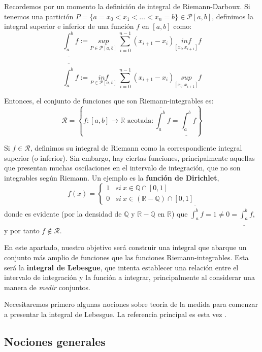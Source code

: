 Recordemos por un momento la definición de integral de Riemann-Darboux. Si tenemos una partición $P = \{ a = x_0 < x_1 < \dots < x_n = b\} \in \mathcal P [a,b]$, definimos la integral superior e inferior de una función $f$ en $[a,b]$ como: $$\underline{\int_a^b} f := \underset{P \in \mathcal P [a,b]}{sup} \ \sum_{i=0}^{n-1} (x_{i+1} - x_i) \underset{[x_i, x_{i+1}]}{inf} f$$

$$\overline {\int_a^b} f := \underset{P \in \mathcal P [a,b]}{inf} \ \sum_{i=0}^{n-1} (x_{i+1} - x_i) \underset{[x_i, x_{i+1}]}{sup} f$$

Entonces, el conjunto de funciones que son Riemann-integrables es: $$\mathcal R = \left\{ f:[a,b] \to \mathbb{R} \text{ acotada} : \overline {\int_a^b} f = \underline {\int_a^b} f\right\}$$

Si $f \in \mathcal R$, definimos su integral de Riemann como la correspondiente integral superior (o inferior). Sin embargo, hay ciertas funciones, principalmente aquellas que presentan muchas oscilaciones en el intervalo de integración, que no son integrables según Riemann. Un ejemplo es la \textbf{función de Dirichlet}, $$f(x) = \begin{cases} 1 & si \ x \in \mathbb Q \cap [0,1]\\ 0 & si \ x \in (\mathbb{R} - \mathbb Q) \cap [0,1] \end{cases}$$ donde es evidente (por la densidad de $\mathbb Q$ y $\mathbb{R} - \mathbb Q$ en $\mathbb{R}$) que $\displaystyle \overline {\int_a^b} f = 1 \ne 0 = \underline {\int_a^b} f$, y por tanto $f \notin \mathcal R$.

En este apartado, nuestro objetivo será construir una integral que abarque un conjunto más amplio de funciones que las funciones Riemann-integrables. Esta será la \textbf{integral de Lebesgue}, que intenta establecer una relación entre el intervalo de integración y la función a integrar, principalmente al considerar una manera de \textit{medir} conjuntos.

Necesitaremos primero algunas nociones sobre teoría de la medida para comenzar a presentar la integral de Lebesgue. La referencia principal es esta vez \cite[Chapter 1]{rudin}.



\subsection{Nociones generales}

